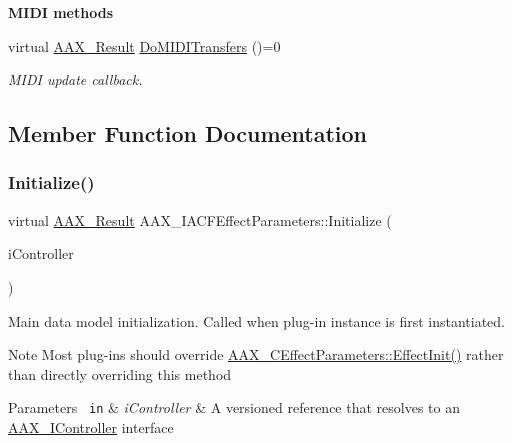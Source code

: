 \begin{Indent}\textbf{ M\+I\+DI methods}\par
\begin{DoxyCompactItemize}
\item 
virtual \mbox{\hyperlink{a00392_a4d8f69a697df7f70c3a8e9b8ee130d2f}{A\+A\+X\+\_\+\+Result}} \mbox{\hyperlink{a01669_af376aef3d3ecdc6287f820b4e01f5c9b}{Do\+M\+I\+D\+I\+Transfers}} ()=0
\begin{DoxyCompactList}\small\item\em M\+I\+DI update callback. \end{DoxyCompactList}\end{DoxyCompactItemize}
\end{Indent}


\subsection{Member Function Documentation}
\mbox{\label{a01669_ad4db3c0ab67f8f41cdd042a915daabb4}} 
\subsubsection{\texorpdfstring{Initialize()}{Initialize()}}
{\footnotesize\ttfamily virtual \mbox{\hyperlink{a00392_a4d8f69a697df7f70c3a8e9b8ee130d2f}{A\+A\+X\+\_\+\+Result}} A\+A\+X\+\_\+\+I\+A\+C\+F\+Effect\+Parameters\+::\+Initialize (\begin{DoxyParamCaption}\item[{\mbox{\hyperlink{a01409}{I\+A\+C\+F\+Unknown}} $\ast$}]{i\+Controller }\end{DoxyParamCaption})\hspace{0.3cm}{\ttfamily [pure virtual]}}



Main data model initialization. Called when plug-\/in instance is first instantiated. 

\begin{DoxyNote}{Note}
Most plug-\/ins should override \mbox{\hyperlink{a01481_a2e302fd758d39a6a855023bf825fe148}{A\+A\+X\+\_\+\+C\+Effect\+Parameters\+::\+Effect\+Init()}} rather than directly overriding this method
\end{DoxyNote}

\begin{DoxyParams}[1]{Parameters}
\mbox{\texttt{ in}}  & {\em i\+Controller} & A versioned reference that resolves to an \mbox{\hyperlink{a01789}{A\+A\+X\+\_\+\+I\+Controller}} interface \\
\hline
\end{DoxyParams}


